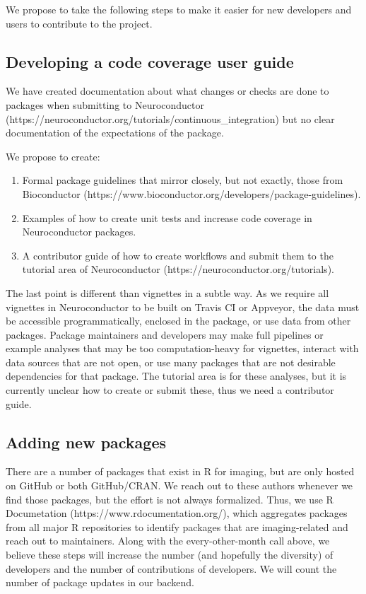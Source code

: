 \documentclass[]{elsarticle} %
\providecommand{\tightlist}{%
  \setlength{\itemsep}{0pt}\setlength{\parskip}{0pt}}
\begin{document}
We propose to take the following steps to make it easier for new developers and users to contribute to the project.

\hypertarget{developing-a-code-coverage-user-guide}{%
\subsection{Developing a code coverage user guide}\label{developing-a-code-coverage-user-guide}}

We have created documentation about what changes or checks are done to packages when submitting to Neuroconductor (https://neuroconductor.org/tutorials/continuous\_integration) but no clear documentation of the expectations of the package.

We propose to create:

\begin{enumerate}
\def\labelenumi{\arabic{enumi}.}
\tightlist
\item
  Formal package guidelines that mirror closely, but not exactly, those from Bioconductor
  (https://www.bioconductor.org/developers/package-guidelines).
\item
  Examples of how to create unit tests and increase code coverage in Neuroconductor packages.
\item
  A contributor guide of how to create workflows and submit them to the tutorial area of Neuroconductor (https://neuroconductor.org/tutorials).
\end{enumerate}

The last point is different than vignettes in a subtle way. As we require all vignettes in Neuroconductor to be built on Travis CI or Appveyor, the data must be accessible programmatically, enclosed in the package, or use data from other packages. Package maintainers and developers may make full pipelines or example analyses that may be too computation-heavy for vignettes, interact with data sources that are not open, or use many packages that are not desirable dependencies for that package. The tutorial area is for these analyses, but it is currently unclear how to create or submit these, thus we need a contributor guide.

\hypertarget{adding-new-packages}{%
\subsection{Adding new packages}\label{adding-new-packages}}

There are a number of packages that exist in R for imaging, but are only hosted on GitHub or both GitHub/CRAN. We reach out to these authors whenever we find those packages, but the effort is not always formalized. Thus, we use R Documetation (https://www.rdocumentation.org/), which aggregates packages from all major R repositories to identify packages that are imaging-related and reach out to maintainers. Along with the every-other-month call above, we believe these steps will increase the number (and hopefully the diversity) of developers and the number of contributions of developers. We will count the number of package updates in our backend.
\end{document}
